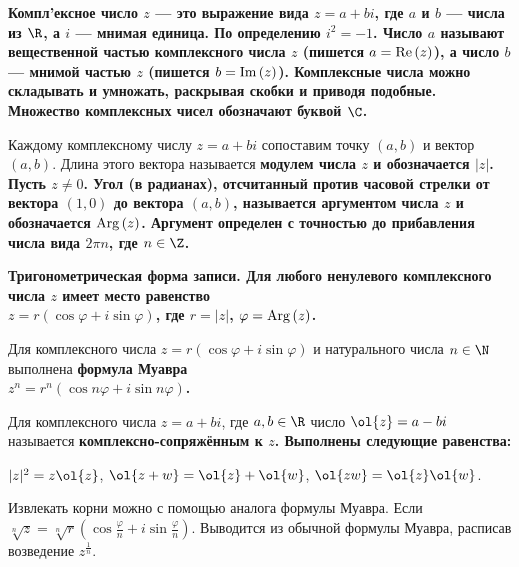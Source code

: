 \begin{solution}
\bf{Компл'ексное число} \(z\) --- это выражение вида \(z=a+bi\), где \(a\) и \(b\) --- числа из \(\R\), а \(i\) --- \bf{мнимая единица}. По определению \(i^2=-1\).
Число \(a\) называют \bf{вещественной частью} комплексного числа \(z\) (пишется \(a={\rm Re}\,(z)\)), а число \(b\) --- \bf{мнимой частью} \(z\) (пишется \(b={\rm Im}\,(z)\)).
Комплексные числа можно складывать и умножать, \lgq раскрывая скобки и приводя подобные\rgq. Множество комплексных чисел обозначают буквой \(\C\).

Каждому комплексному числу \(z=a+bi\) сопоставим точку \((a,b)\) и вектор \((a,b)\). Длина этого вектора называется \bf{модулем} числа \(z\) и обозначается \(|z|\). Пусть \(z\ne0\).
Угол (в радианах), отсчитанный против часовой стрелки от вектора \((1,0)\) до вектора \((a,b)\), называется \bf{аргументом} числа \(z\) и обозначается \({\rm Arg}\,(z)\). Аргумент определен с точностью до прибавления числа вида \(2\pi n\), где \(n\in\Z\).

\bf{Тригонометрическая форма записи.} Для любого ненулевого комплексного числа \(z\) имеет место равенство\\ \(z=r (\cos \varphi +i\sin \varphi )\), где \(r=|z|\), \(\varphi={\rm Arg}\,(z)\).

Для комплексного числа \(z=r(\cos\varphi+i\sin\varphi)\) и натурального числа \(n\in\N\) выполнена \bf{формула Муавра}\\
\(z^n=r^n(\cos n\varphi+i\sin n\varphi)\).

Для комплексного числа \(z=a+bi\), где \(a,b\in \R\) число \(\ol{z}=a-bi\) называется \bf{комплексно-сопряжённым} к \(z\). Выполнены следующие равенства:

\(|z|^2=z\ol{z}\), \(\ol{z+w} = \ol{z} + \ol{w}\), \(\ol{zw}= \ol{z}\ol{w}\).

Извлекать корни можно с помощью аналога формулы Муавра. Если $\sqrt[n]{z}=\sqrt[n]{r}(\cos \frac{\varphi}{n}+i\sin \frac{\varphi}{n})$. Выводится из обычной формулы Муавра, расписав возведение $z^{\frac{1}{n}}$.
\end{solution}

